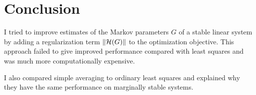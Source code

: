 \section{Conclusion}

I tried to improve estimates of the Markov parameters $G$
of a stable linear system
by adding a regularization term $\left\Vert{\mathcal{H}(G)}\right\Vert$
to the optimization objective.
This approach failed to give improved performance
compared with least squares
and was much more computationally expensive.

I also compared simple averaging to ordinary least squares
and explained why they have the same performance
on marginally stable systems.
